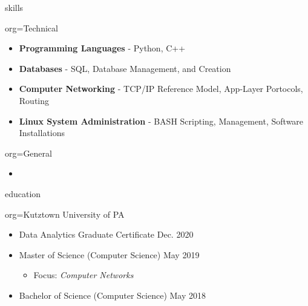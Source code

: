 \documentclass{resume}
\begin{document}
\begin{ResumeSection}{skills}
    \newcommand{\skill}[2]{\textbf{#1} - #2}
    \begin{ResumeSubsection}{org=Technical}
        \begin{itemize}
            \item \skill{Programming Languages}{Python, C++}
            \item \skill{Databases}{SQL, Database Management, and Creation}
            \item \skill{Computer Networking}{TCP/IP Reference Model, App-Layer Portocols, Routing}
            \item \skill{Linux System Administration}{BASH Scripting, Management, Software Installations}
        \end{itemize}
    \end{ResumeSubsection}
    \begin{ResumeSubsection}{org=General}
        \begin{itemize}
            \item \lipsum[1][1]
        \end{itemize}
    \end{ResumeSubsection}
\end{ResumeSection}

\begin{ResumeSection}{education}
    \begin{ResumeSubsection}{org={Kutztown University of PA}}
        \begin{itemize}
            \item Data Analytics Graduate Certificate \hfill Dec. 2020
            \item Master of Science (Computer Science) \hfill May 2019
            \begin{itemize}
                \item Focus: \emph{Computer Networks}
            \end{itemize}
            \item Bachelor of Science (Computer Science) \hfill May 2018
        \end{itemize}
    \end{ResumeSubsection}
\end{ResumeSection}
\end{document}
